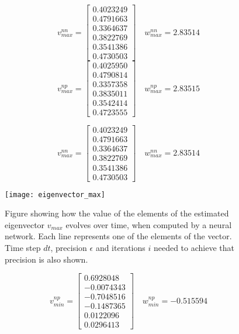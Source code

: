 \begin{equation*}
v_{max}^{nn} = \begin{bmatrix}
	0.4023249 \\
	0.4791663 \\
	0.3364637 \\
	0.3822769 \\
	0.3541386 \\
	0.4730503
\end{bmatrix} \quad w_{max}^{nn} = 2.83514
\end{equation*}\begin{equation*}
v_{max}^{np} = \begin{bmatrix}
	0.4025950 \\
	0.4790814 \\
	0.3357358 \\
    0.3835011 \\
    0.3542414 \\
    0.4723555
\end{bmatrix} \quad w_{max}^{np} =  2.83515
\end{equation*}

\begin{equation*}
v_{max}^{nn} = \begin{bmatrix}
	0.4023249 \\
	0.4791663 \\
	0.3364637 \\
	0.3822769 \\
	0.3541386 \\
	0.4730503
\end{bmatrix} \quad w_{max}^{nn} = 2.83514
\end{equation*}

 \begin{figure}[htbp]
 	\centering
 	\texttt{[image: eigenvector\_max]}
 	\caption{Figure showing how the value of the elements of the estimated eigenvector $v_{max}$ evolves over time, when computed by a neural network. Each line represents one of the elements of the vector. Time step $dt$, precision $\epsilon$ and iterations $i$ needed to achieve that precision is also shown.}
 	\label{fig:eigenvector_max}
 \end{figure}

 \begin{equation*}
	 v_{min}^{np} = \begin{bmatrix}
	  0.6928048 \\
	 -0.0074343 \\
	 -0.7048516 \\
	 -0.1487365 \\
	 0.0122096 \\
	 0.0296413
	 \end{bmatrix} \quad w_{min}^{np} = -0.515594
 \end{equation*}

